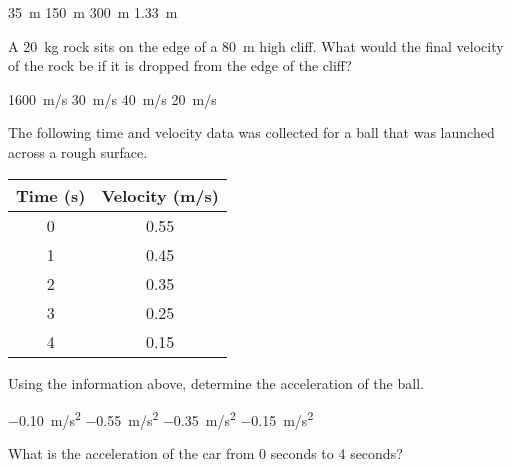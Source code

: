 \documentclass[answers,dvipsnames]{exam}
\begin{document}
\begin{questions}
\begin{randomizechoices}[norandomize]
    \choice \SI{35}{m}
    \correctchoice \SI{150}{m}
    \choice \SI{300}{m}
    \choice \SI{1.33}{m}
\end{randomizechoices}

\question
A \SI{20}{kg} rock sits on the edge of a \SI{80}{m} high cliff.  What would the final velocity of the rock be if it is dropped from the edge of the cliff?

\begin{randomizechoices}[norandomize]
    \choice \SI{1600}{m/s}
    \choice \SI{30}{m/s}
    \correctchoice \SI{40}{m/s}
    \choice \SI{20}{m/s}
\end{randomizechoices}

\question
The following time and velocity data was collected for a ball that was launched across a rough surface. 

\begin{center}
    \begin{tabular}{|c|c|}
        \hline
        \textbf{Time} (s) & \textbf{Velocity} (m/s) \\ \hline
        0 & 0.55\\ \hline
        1 & 0.45\\ \hline
        2 & 0.35\\ \hline
        3 & 0.25\\ \hline
        4 & 0.15\\ \hline
    \end{tabular}
\end{center}

Using the information above, determine the acceleration of the ball. 

\begin{randomizechoices}[norandomize]
    \correctchoice \SI{-0.10}{m/s^2}
    \choice \SI{-0.55}{m/s^2}
    \choice \SI{-0.35}{m/s^2}
    \choice \SI{-0.15}{m/s^2}
\end{randomizechoices}

\question 
What is the acceleration of the car from 0 seconds to 4 seconds?

\begin{center}
\end{center}


\end{questions}
\end{document}
